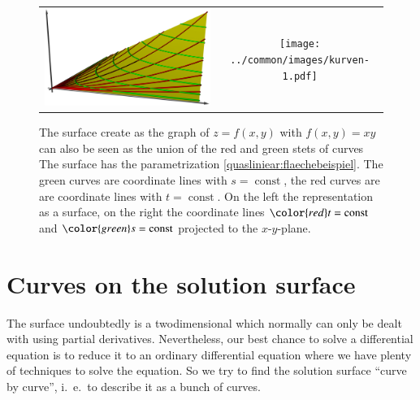 %
%
%
\begin{figure}
\centering
\begin{tabular}{cc}
\includegraphics[width=0.6\hsize]{../common/3d/surface.jpg}&%
\texttt{[image: ../common/images/kurven-1.pdf]}
\end{tabular}
\caption{The surface create as the graph of $z=f(x,y)$ with $f(x,y)=xy$
can also be seen as the union of the red and green stets of curves
The surface has the parametrization \eqref{quasliniear:flaechebeispiel}.
The green curves are coordinate lines with $s=\operatorname{const}$,
the red curves are are coordinate lines with $t=\operatorname{const}$.
On the left the representation as a surface, on the right the coordinate
lines
${\color{red}t}=\operatorname{const}$
and
${\color{green}s}=\operatorname{const}$
projected to the $x$-$y$-plane.
\label{quasilinear:flaechenalskurven}
}
\end{figure}

\section{Curves on the solution surface}
The surface undoubtedly is a twodimensional which normally can only be dealt
with using partial derivatives.
Nevertheless, our best chance to solve a differential equation is to 
reduce it to an ordinary differential equation where we have plenty
of techniques to solve the equation.
So we try to find the solution surface ``curve by curve'', i.~e.~to describe
it as a bunch of curves.

